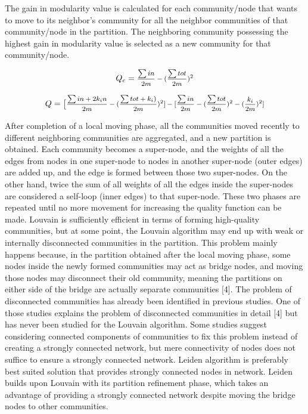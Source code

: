 \documentclass[sigconf, nonacm]{acmart}
\begin{document}
The gain in modularity value is calculated for each community/node that wants to move to its neighbor’s community for all the neighbor communities of that community/node in the partition. The neighboring community possessing the highest gain in modularity value is selected as a new community for that community/node. 

\begin{equation} \label{eqn:Qc}
{
Q_c= \text{\footnotesize $ \frac{\sum in}{2m} -(\frac{\sum tot}{2m})^2  $}
}
\end{equation}

\begin{equation} \label{eqn:dQ}
{
Q = \text{\footnotesize $ \bigr[\frac{\sum in+2k_in}{2m} - (\frac{\sum tot+k_i)}{2m})^2]-[\frac{\sum in}{2m}-(\frac{\sum tot}{2m})^2-(\frac{k_i}{2m})^2 ] $}
}
\end{equation}

After completion of a local moving phase, all the communities moved recently to different neighboring communities are aggregated, and a new partition is obtained. Each community becomes a super-node, and the weights of all the edges from nodes in one super-node to nodes in another super-node (outer edges) are added up, and the edge is formed between those two super-nodes. On the other hand, twice the sum of all weights of all the edges inside the super-nodes are considered a self-loop (inner edges) to that super-node. These two phases are repeated until no more movement for increasing the quality function can be made. Louvain is sufficiently efficient in terms of forming high-quality communities, but at some point, the Louvain algorithm may end up with weak or internally disconnected communities in the partition. This problem mainly happens because, in the partition obtained after the local moving phase, some nodes inside the newly formed communities may act as bridge nodes, and moving those nodes may disconnect their old community, meaning the partitions on either side of the bridge are actually separate communities [4]. The problem of disconnected communities has already been identified in previous studies. One of those studies explains the problem of disconnected communities in detail [4] but has never been studied for the Louvain algorithm. Some studies suggest considering connected components of communities to fix this problem instead of creating a strongly connected network, but mere connectivity of nodes does not suffice to ensure a strongly connected network. Leiden algorithm is preferably best suited solution that provides strongly connected nodes in network. Leiden builds upon Louvain with its partition refinement phase, which takes an advantage of providing a strongly connected network despite moving the bridge nodes to other communities. 
\end{document}
